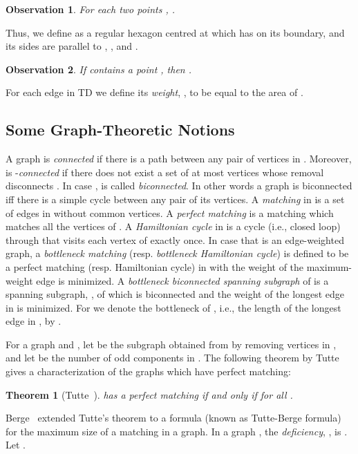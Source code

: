 \documentclass[11pt,a4paper]{article}
\newcommand{\kTD}[2]{\text{-}TD#2}
\newtheorem{theorem}{Theorem}
\newtheorem{observation}{Observation}
\begin{document}
\begin{observation}
 \label{equal-triangles}
 For each two points , .
\end{observation}
Thus, we define  as a regular hexagon centred at  which has  on its boundary, and its sides are parallel to , , and . 
\begin{observation}
\label{obs2}
 If  contains a point , then .
\end{observation}
For each edge  in \kTD{k}{} we define its {\em weight}, , to be equal to the area of .
\subsection{Some Graph-Theoretic Notions}
\label{graph-notions}
A graph  is {\em connected} if there is a path between any pair of vertices in . Moreover,  is -{\em connected} if there does not exist a set of at most  vertices whose removal disconnects . In case ,  is called {\em biconnected}. In other words a graph  is biconnected iff there is a simple cycle between any pair of its vertices. A {\em matching} in  is a set of edges in  without common vertices. A {\em perfect matching} is a matching which matches all the vertices of . A {\em Hamiltonian cycle} in  is a cycle (i.e., closed loop) through  that visits each vertex of  exactly once.
In case that  is an edge-weighted graph, a {\em bottleneck matching} (resp. {\em bottleneck Hamiltonian cycle}) is defined to be a perfect matching (resp. Hamiltonian cycle) in  with the weight of the maximum-weight edge is minimized. A {\em bottleneck biconnected spanning subgraph} of  is a spanning subgraph, , of  which is biconnected and the weight of the longest edge in  is minimized. For  we denote the bottleneck of , i.e., the length of the longest edge in , by .

 
For a graph  and , let  be the subgraph obtained from  by removing vertices in , and let  be the number of odd components in . The following theorem by Tutte~\cite{Tutte1947} gives a characterization of the graphs which have perfect matching: 

\begin{theorem}[Tutte~\cite{Tutte1947}] 
\label{Tutte} 
 has a perfect matching if and only if  for all .
\end{theorem}

Berge~\cite{Berge1958} extended Tutte’s theorem to a formula (known as Tutte-Berge formula) for the maximum size of a matching in a graph. In a graph , the {\em deficiency}, , is . Let .
\end{document}
